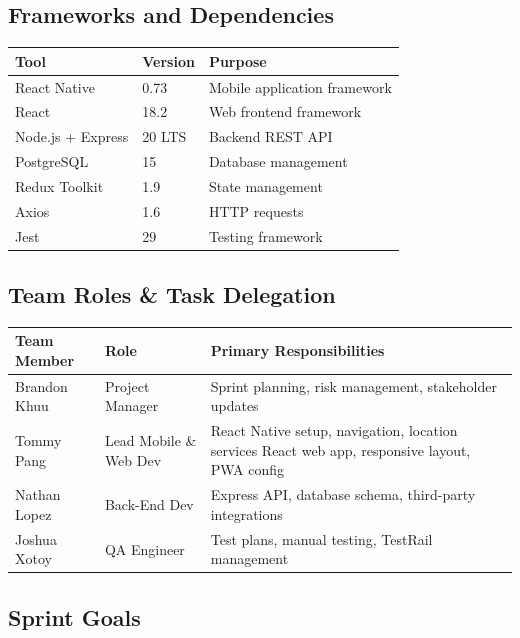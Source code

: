 \documentclass[12pt]{article}
\begin{document}
\subsection{Frameworks and Dependencies}

\begin{longtable}{|p{5cm}|p{3cm}|p{5cm}|}
\hline
\textbf{Tool} & \textbf{Version} & \textbf{Purpose} \\
\hline
React Native & 0.73 & Mobile application framework \\
\hline
React & 18.2 & Web frontend framework \\
\hline
Node.js + Express & 20 LTS & Backend REST API \\
\hline
PostgreSQL & 15 & Database management \\
\hline
Redux Toolkit & 1.9 & State management \\
\hline
Axios & 1.6 & HTTP requests \\
\hline
Jest & 29 & Testing framework \\
\hline
\end{longtable}

\subsection{Team Roles \&  Task Delegation}

\begin{longtable}{|p{3cm}|p{3cm}|p{7cm}|}
\hline
\textbf{Team Member} & \textbf{Role} & \textbf{Primary Responsibilities} \\
\hline
Brandon Khuu & Project Manager & Sprint planning, risk management, stakeholder updates \\
\hline
Tommy Pang & Lead Mobile \& Web Dev & React Native setup, navigation, location services \newline
React web app, responsive layout, PWA config\\
\hline
Nathan Lopez & Back-End Dev & Express API, database schema, third-party integrations \\
\hline
Joshua Xotoy & QA Engineer & Test plans, manual testing, TestRail management\\
\hline
\end{longtable}



\subsection{Sprint Goals}
\end{document}
